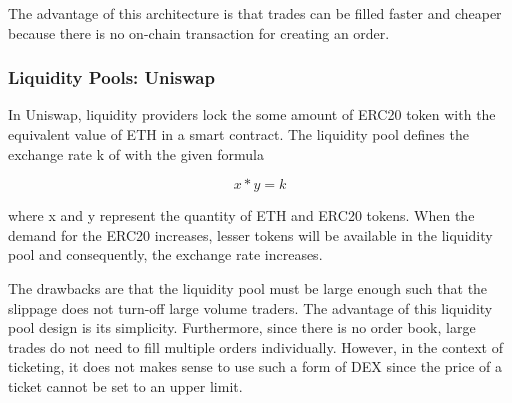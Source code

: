 The advantage of this architecture is that trades can be filled faster and cheaper because there is no on-chain transaction for creating an order.


\subsubsection{Liquidity Pools: Uniswap}

In Uniswap, liquidity providers lock the some amount of ERC20 token with the equivalent value of ETH in a smart contract. The liquidity pool defines the exchange rate k of with the given formula 

\[ x * y = k \]

where x and y represent the quantity of ETH and ERC20 tokens. When the demand for the ERC20 increases, lesser tokens will be available in the liquidity pool and consequently, the exchange rate increases. 

The drawbacks are that the liquidity pool must be large enough such that the slippage does not turn-off large volume traders. The advantage of this liquidity pool design is its simplicity. Furthermore, since there is no order book, large trades do not need to fill multiple orders individually. However, in the context of ticketing, it does not makes sense to use such a form of DEX since the price of a ticket cannot be set to an upper limit. 